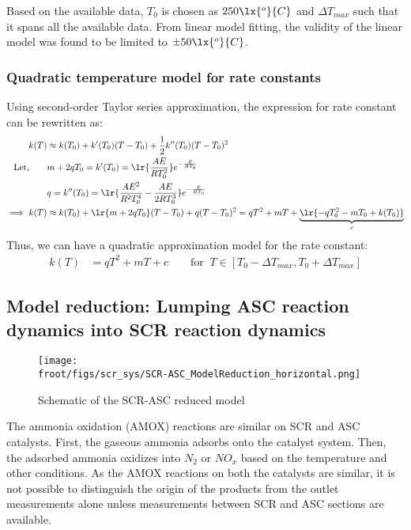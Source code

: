 Based on the available data, $T_0$ is chosen as $250 \lx{^o}{C}$ and $\Delta T_{max}$ such that it spans all the
available data. From linear model fitting, the validity of the linear model was found to be limited to $\pm 50
\lx{^o}{C}$.

\subsubsection{Quadratic temperature model for rate constants}
Using second-order Taylor series approximation, the expression for rate constant can be rewritten as:
\begin{align*}
    k(T) &\approx k(T_0) + k'(T_0) (T - T_0) + \frac{1}{2} k''(T_0) (T - T_0)^2\\
    \text{Let,} \qquad
    &m + 2qT_0 = k'(T_0) = \lr{\frac{AE}{RT_0^2}} e^{-\frac{E}{RT_0}} \\
    &q = k''(T_0) = \lr{\frac{A E^2}{R^2 T_0^4} - \frac{A E}{2 R T_0^3}} e^{-\frac{E}{RT_0}} \\
    \implies k(T) &\approx k(T_0) + \lr{m + 2qT_0} (T - T_0) + q (T - T_0)^2
                   = q T^2 + m T + \underbrace{\lr{ -  q T_0^2 - mT_0  + k(T_0)}}_c
\end{align*}
Thus, we can have a quadratic approximation model for the rate constant:
\begin{align}
    k(T) &= q T^2 + m T + c \qquad \text{for } \: T \in [T_0 - \Delta T_{max}, T_0 + \Delta T_{max}]
\end{align}

\subsection{Model reduction: Lumping ASC reaction dynamics into SCR reaction dynamics}

\begin{figure}[H]
    \centering
    \texttt{[image: \\froot/figs/scr\_sys/SCR-ASC\_ModelReduction\_horizontal.png]}
    \caption{Schematic of the SCR-ASC reduced model}
    \label{fig:scr-asc}
\end{figure}

The ammonia oxidation (AMOX) reactions are similar on SCR and ASC catalysts. First, the gaseous ammonia adsorbs onto the
catalyst system. Then, the adsorbed ammonia oxidizes into $N_2$ or $NO_x$ based on the temperature and other conditions.
As the AMOX reactions on both the catalysts are similar, it is not possible to distinguish the origin of the products
from the outlet measurements alone unless measurements between SCR and ASC sections are available.

